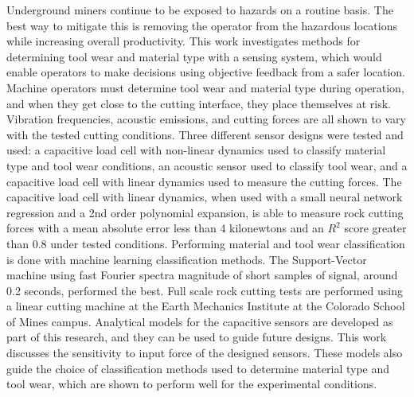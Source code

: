 Underground miners continue to be exposed to hazards on a routine basis.
The best way to mitigate this is removing the operator from the hazardous locations
while increasing overall productivity.
This work investigates methods for determining tool wear and material type
with a sensing system, which would enable operators to make decisions using objective feedback
from a safer location.
Machine operators must determine tool wear and material type during operation,
and when they get close to the cutting interface, they place themselves at risk.
Vibration frequencies, acoustic emissions, and cutting forces are all shown to 
vary with the tested cutting conditions.
Three different sensor designs were tested and used: 
a capacitive load cell with non-linear dynamics used to classify material type and tool wear conditions,
an acoustic sensor used to classify tool wear,
and a capacitive load cell with linear dynamics used to measure the cutting forces.
The capacitive load cell with linear dynamics, when used with a small neural network regression and a 2nd order polynomial
expansion, is able to measure rock cutting forces with a mean absolute error less than 4 kilonewtons
and an $R^2$ score greater than 0.8 under tested conditions.
Performing material and tool wear classification is done
with machine learning classification methods.
The Support-Vector machine using fast Fourier spectra magnitude 
of short samples of signal, around 0.2 seconds, performed the best.
Full scale rock cutting tests are performed using a linear cutting machine at the Earth Mechanics Institute 
at the Colorado School of Mines campus.
Analytical models for the capacitive sensors are developed as part of this research, and 
they can be used to guide future designs. 
This work discusses the sensitivity to input force of the designed sensors.
These models also guide the choice of classification methods used to determine material type and tool wear,
which are shown to perform well for the experimental conditions.
